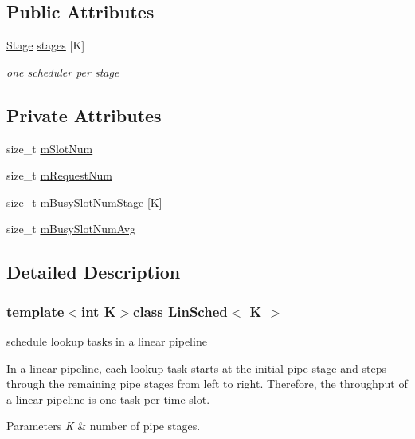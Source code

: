 \subsection*{Public Attributes}
\begin{DoxyCompactItemize}
\item 
\hyperlink{structLinSched_1_1Stage}{Stage} \hyperlink{classLinSched_a825ee41205fa4e9dd53fc8f2ac444494}{stages} \mbox{[}K\mbox{]}
\begin{DoxyCompactList}\small\item\em one scheduler per stage \end{DoxyCompactList}\end{DoxyCompactItemize}
\subsection*{Private Attributes}
\begin{DoxyCompactItemize}
\item 
size\-\_\-t \hyperlink{classLinSched_a851cef882cb7392a1887b0d77cb83ec8}{m\-Slot\-Num}
\item 
size\-\_\-t \hyperlink{classLinSched_a864879d805b12ea6c2dd1641fc86ffbe}{m\-Request\-Num}
\item 
size\-\_\-t \hyperlink{classLinSched_ac64077553a7f146e98dbd84365c1a552}{m\-Busy\-Slot\-Num\-Stage} \mbox{[}K\mbox{]}
\item 
size\-\_\-t \hyperlink{classLinSched_a084c69c2890d7700e1ce14ed8da179e6}{m\-Busy\-Slot\-Num\-Avg}
\end{DoxyCompactItemize}


\subsection{Detailed Description}
\subsubsection*{template$<$int K$>$class Lin\-Sched$<$ K $>$}

schedule lookup tasks in a linear pipeline 

In a linear pipeline, each lookup task starts at the initial pipe stage and steps through the remaining pipe stages from left to right. Therefore, the throughput of a linear pipeline is one task per time slot.


\begin{DoxyParams}{Parameters}
{\em K} & number of pipe stages. \\
\hline
\end{DoxyParams}


